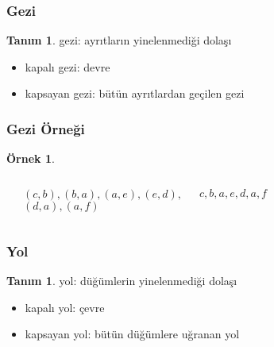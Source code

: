 \documentclass[dvipsnames]{beamer}
\theoremstyle{definition}
\newtheorem{tanim}[theorem]{Tanım}
\theoremstyle{example}
\newtheorem{ornek}[theorem]{Örnek}
\theoremstyle{plain}
\begin{document}
\begin{frame}
  \frametitle{Gezi}

  \begin{tanim}
    \alert{gezi}: ayrıtların yinelenmediği dolaşı

    \pause
    \begin{itemize}
      \item kapalı gezi: \alert{devre}
      \item \alert{kapsayan gezi}: bütün ayrıtlardan geçilen gezi
    \end{itemize}
  \end{tanim}
\end{frame}

\begin{frame}
  \frametitle{Gezi Örneği}

  \begin{ornek}
    \begin{columns}
      \begin{center}
      \end{center}

      $(c,b),(b,a),(a,e),(e,d),$\\
      $(d,a),(a,f)$

      \medskip
      $c,b,a,e,d,a,f$
    \end{columns}
  \end{ornek}
\end{frame}

\begin{frame}
  \frametitle{Yol}

  \begin{tanim}
    \alert{yol}: düğümlerin yinelenmediği dolaşı

    \pause
    \begin{itemize}
      \item kapalı yol: \alert{çevre}
      \item \alert{kapsayan yol}: bütün düğümlere uğranan yol
    \end{itemize}
  \end{tanim}
\end{frame}
\end{document}
